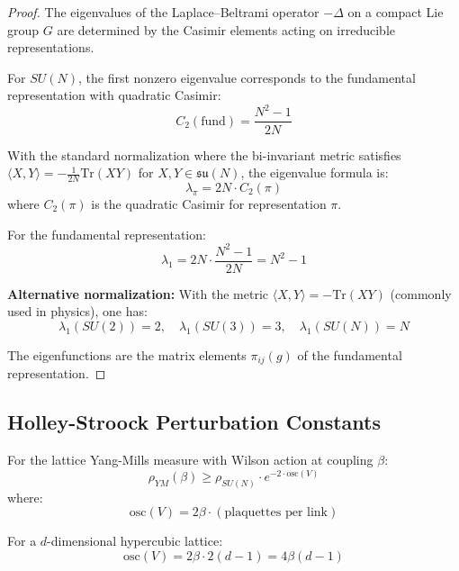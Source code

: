 \begin{proof}
The eigenvalues of the Laplace--Beltrami operator $-\Delta$ on a compact Lie group 
$G$ are determined by the Casimir elements acting on irreducible representations.

For $SU(N)$, the first nonzero eigenvalue corresponds to the fundamental 
representation with quadratic Casimir:
\[
C_2(\text{fund}) = \frac{N^2-1}{2N}
\]

With the standard normalization where the bi-invariant metric satisfies 
$\langle X, Y \rangle = -\frac{1}{2N}\mathrm{Tr}(XY)$ for $X, Y \in \mathfrak{su}(N)$, 
the eigenvalue formula is:
\[
\lambda_\pi = 2N \cdot C_2(\pi)
\]
where $C_2(\pi)$ is the quadratic Casimir for representation $\pi$.

For the fundamental representation:
\[
\lambda_1 = 2N \cdot \frac{N^2-1}{2N} = N^2 - 1
\]

\textbf{Alternative normalization:} With the metric $\langle X, Y \rangle = -\mathrm{Tr}(XY)$
(commonly used in physics), one has:
\[
\lambda_1(SU(2)) = 2, \quad \lambda_1(SU(3)) = 3, \quad \lambda_1(SU(N)) = N
\]

The eigenfunctions are the matrix elements $\pi_{ij}(g)$ of the fundamental representation.
\end{proof}

\subsection{Holley-Stroock Perturbation Constants}

\begin{theorem}
\label{thm:hs-explicit}
For the lattice Yang-Mills measure with Wilson action at coupling $\beta$:
\[
\rho_{YM}(\beta) \geq \rho_{SU(N)} \cdot e^{-2 \cdot \mathrm{osc}(V)}
\]
where:
\[
\mathrm{osc}(V) = 2\beta \cdot (\text{plaquettes per link})
\]

For a $d$-dimensional hypercubic lattice:
\[
\mathrm{osc}(V) = 2\beta \cdot 2(d-1) = 4\beta(d-1)
\]
\end{theorem}

